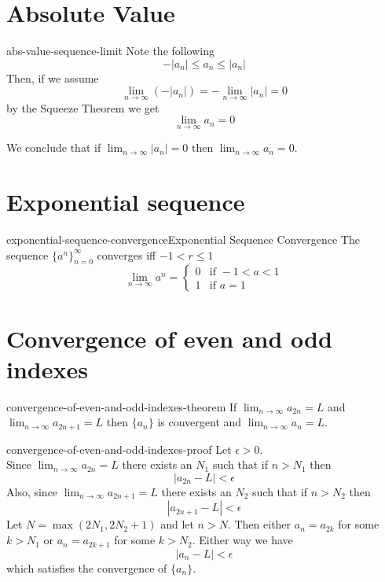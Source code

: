 \documentclass[preview]{standalone}
\begin{document}
\section{Absolute Value}

\begin{snippet}{abs-value-sequence-limit}
Note the following
\[
    -|a_n| \leq a_n \leq |a_n|
\]
Then, if we assume
\[
    \lim_{n\to\infty} (-|a_n|) = - \lim_{n\to\infty} |a_n| =0 
\]
by the Squeeze Theorem we get
\[
    \lim_{n\to\infty} a_n =0
\]

We conclude that if \(\lim_{n\to\infty} |a_n|=0\) then
\(\lim_{n\to\infty} a_n=0\).
\end{snippet}

\section{Exponential sequence} %

\begin{snippettheorem}{exponential-sequence-convergence}{Exponential Sequence Convergence}{
    The sequence \({\{a^n\}}_{n=0}^\infty\) converges iff \(-1<r\leq 1\)
    \[
        \lim_{n\to\infty} a^n = \begin{cases}
            0 & \text{if } -1 < a < 1 \\
            1 & \text{if } a=1
        \end{cases}
    \]
}
\end{snippettheorem}

\section{Convergence of even and odd indexes}

\begin{snippettheorem}{convergence-of-even-and-odd-indexes-theorem}{}{
    If \(\lim_{n\to\infty}a_{2n}=L\) and \(\lim_{n\to\infty}a_{2n+1}=L\)
    then \(\{a_n\}\) is convergent and \(\lim_{n\to\infty}a_n=L\).
}
\end{snippettheorem}

\begin{snippetproof}{convergence-of-even-and-odd-indexes-proof}{}{
    Let \(\epsilon>0\). \\
    Since \(\lim_{n\to\infty}a_{2n}=L\) there exists an \(N_1\) such that
    if \(n>N_1\) then
    \[
        |a_{2n}-L|<\epsilon
    \]
    Also, since \(\lim_{n\to\infty}a_{2n+1}=L\) there exists an \(N_2\) such that
    if \(n>N_2\) then
    \[
        |a_{2n+1}-L|<\epsilon
    \]
    Let \(N=\max(2N_1, 2N_2+1)\) and let \(n>N\).
    Then either \(a_n=a_{2k}\) for some \(k>N_1\) or \(a_n=a_{2k+1}\)
    for some \(k>N_2\). Either way we have
    \[
        |a_n-L|<\epsilon
    \]
    which satisfies the convergence of \(\{a_n\}\).
}
\end{snippetproof}
\end{document}
